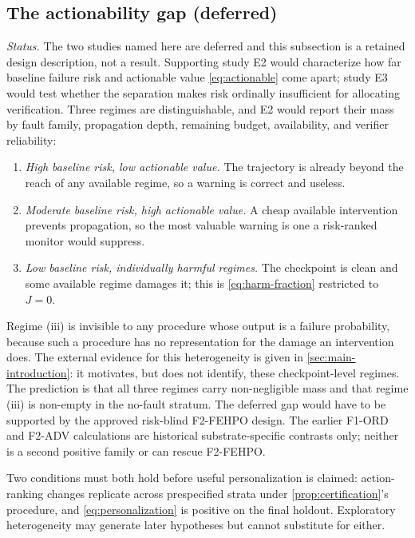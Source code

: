\subsection*{The actionability gap (deferred)}

\emph{Status.} The two studies named here are deferred and this subsection is a
retained design description, not a result.  Supporting study E2 would
characterize how far baseline failure risk and actionable value
\eqref{eq:actionable} come apart; study E3 would test whether the
separation makes risk ordinally insufficient for allocating verification.  Three
regimes are distinguishable, and E2 would report their mass by fault family,
propagation depth, remaining budget, availability, and verifier reliability:

\begin{enumerate}[label=(\roman*),leftmargin=2.2em]
\item \emph{High baseline risk, low actionable value.}  The trajectory is
  already beyond the reach of any available regime, so a warning is correct and
  useless.
\item \emph{Moderate baseline risk, high actionable value.}  A cheap available
  intervention prevents propagation, so the most valuable warning is one a
  risk-ranked monitor would suppress.
\item \emph{Low baseline risk, individually harmful regimes.}  The checkpoint is
  clean and some available regime damages it; this is
  \eqref{eq:harm-fraction} restricted to $J=0$.
\end{enumerate}

Regime (iii) is invisible to any procedure whose output is a failure
probability, because such a procedure has no representation for the damage an
intervention does.  The external evidence for this heterogeneity is given in
\cref{sec:main-introduction}: it motivates, but does not identify, these
checkpoint-level regimes.  The prediction is that all three regimes carry
non-negligible mass and that regime (iii) is non-empty in the no-fault stratum.
The deferred gap would have to be supported by the approved risk-blind
F2-FEHPO design.
The earlier F1-ORD and F2-ADV calculations are historical substrate-specific
contrasts only; neither is a second positive family or can rescue F2-FEHPO.

Two conditions must both hold before useful personalization is claimed:
action-ranking changes replicate across prespecified strata under
\cref{prop:certification}'s procedure, and \cref{eq:personalization} is positive
on the final holdout.  Exploratory heterogeneity may generate later hypotheses
but cannot substitute for either.

